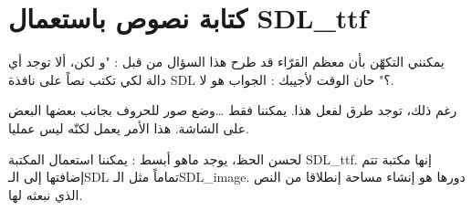 \chapter{كتابة نصوص باستعمال \textenglish{SDL\_ttf}}

يمكنني التكهّن بأن معظم القرّاء قد طرح هذا السؤال من قبل : "و لكن، ألا توجد أي دالة لكي تكتب نصاً على نافذة
\textenglish{SDL} ؟"
حان الوقت لأجيبك : الجواب هو لا.

رغم ذلك، توجد طرق لفعل هذا. يمكننا فقط \dots وضع صور للحروف بجانب بعضها البعض على الشاشة. هذا الأمر يعمل لكنّه ليس عمليا.

لحسن الحظ، يوجد ماهو أبسط : يمكننا استعمال المكتبة
\textenglish{SDL\_ttf}.
إنها مكتبة تتم إضافتها إلى الـ\textenglish{SDL}
تماماً مثل الـ\textenglish{SDL\_image}.
دورها هو إنشاء مساحة
إنطلاقا من النص الذي نبعثه لها.
